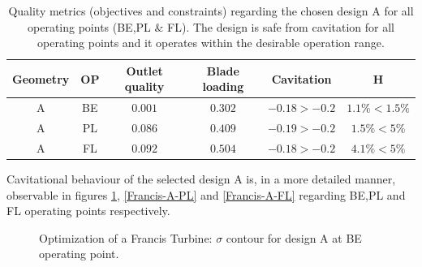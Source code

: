 \begin{table}[h!]
\begin{center}
\begin{tabular}{ |c|c|c|c|c|c| }
\hline
Geometry & OP & Outlet quality & Blade loading  & Cavitation & H\\
\hline
A & BE & $0.001$ & $0.302$ & $-0.18 > -0.2$ & $ 1.1\% <1.5\%$ \\
A & PL & $0.086$ & $0.409$ & $-0.19 > -0.2$ & $ 1.5\% <5\%$ \\
A & FL & $0.092$ & $0.504$ & $-0.18 > -0.2$ & $ 4.1\% <5\%$  \\
\hline
\end{tabular}
\caption{Quality metrics (objectives and constraints) regarding the chosen design A for all operating points (BE,PL $\&$ FL). The design is safe from cavitation for all operating points and it operates within the desirable operation range.}
\label{Asum}
\end{center}
\end{table} 

Cavitational behaviour of the selected design A is, in a more detailed manner, observable in figures \ref{Francis-A-BE}, \ref{Francis-A-PL} and \ref{Francis-A-FL} regarding BE,PL and FL operating points respectively.      


\begin{figure}[h!]
\begin{minipage}[b]{1\linewidth}
 \centering
\end{minipage}
\caption{Optimization of a Francis Turbine: $\sigma$ contour for design A at BE operating point.}
\label{Francis-A-BE}
\end{figure}

